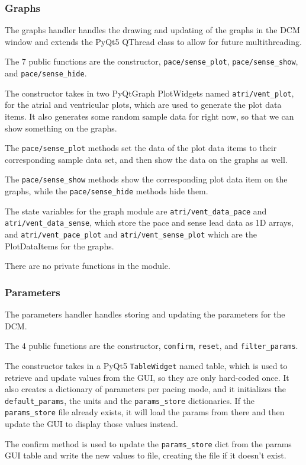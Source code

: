 \documentclass[12pt]{article}
\begin{document}
\subsubsection{Graphs}
The graphs handler handles the drawing and updating of the graphs in the DCM window and extends the PyQt5 QThread class to allow for future multithreading.

The 7 public functions are the constructor, \verb|pace/sense_plot|, \verb|pace/sense_show|, and \verb|pace/sense_hide|.

The constructor takes in two PyQtGraph PlotWidgets named \verb|atri/vent_plot|, for the atrial and ventricular plots, which are used to generate the plot data items.
It also generates some random sample data for right now, so that we can show something on the graphs.

The \verb|pace/sense_plot| methods set the data of the plot data items to their corresponding sample data set, and then show the data on the graphs as well.

The \verb|pace/sense_show| methods show the corresponding plot data item on the graphs, while the \verb|pace/sense_hide| methods hide them.

The state variables for the graph module are \verb|atri/vent_data_pace| and \verb|atri/vent_data_sense|, which store the pace and sense lead data as 1D arrays, and \verb|atri/vent_pace_plot| and \verb|atri/vent_sense_plot| which are the PlotDataItems for the graphs.

There are no private functions in the module.

\subsubsection{Parameters}
The parameters handler handles storing and updating the parameters for the DCM.

The 4 public functions are the constructor, \verb|confirm|, \verb|reset|, and \verb|filter_params|.

The constructor takes in a PyQt5 \verb|TableWidget| named table, which is used to retrieve and update values from the GUI, so they are only hard-coded once.
It also creates a dictionary of parameters per pacing mode, and it initializes the \verb|default_params|, the units and the \verb|params_store| dictionaries.
If the \verb|params_store| file already exists, it will load the params from there and then update the GUI to display those values instead.

The confirm method is used to update the \verb|params_store| dict from the params GUI table and write the new values to file, creating the file if it doesn't exist.
\end{document}
